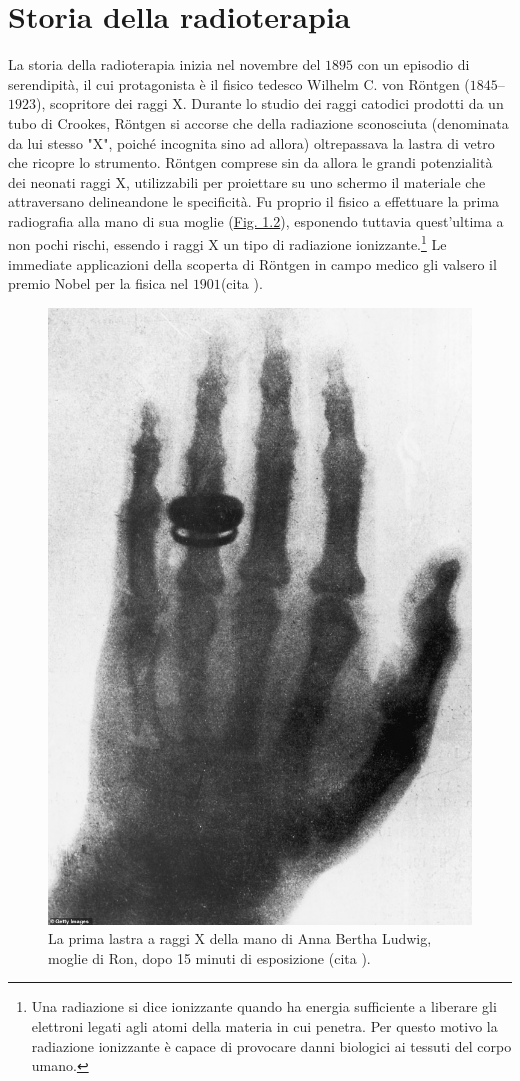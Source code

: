\documentclass[12pt,a4paper,twoside]{report}
\begin{document}
	\section{Storia della radioterapia}
	La storia della radioterapia inizia nel novembre del $1895$ con un episodio di serendipità, il cui protagonista è il fisico tedesco Wilhelm C. von Röntgen ($1845$--$1923$), scopritore dei raggi X. Durante lo studio dei raggi catodici prodotti da un tubo di Crookes, Röntgen si accorse che della radiazione sconosciuta (denominata da lui stesso "X", poiché incognita sino ad allora) oltrepassava la lastra di vetro che ricopre lo strumento. Röntgen comprese sin da allora le grandi potenzialità dei neonati raggi X, utilizzabili per proiettare su uno schermo il materiale che attraversano delineandone le specificità. Fu proprio il fisico a effettuare la prima radiografia alla mano di sua moglie (\hyperref[fig:rongten]{Fig. 1.2}), esponendo tuttavia quest'ultima a non pochi rischi, essendo i raggi X un tipo di radiazione ionizzante.\footnote{Una radiazione si dice ionizzante quando ha energia sufficiente a liberare gli elettroni legati agli atomi della materia in cui penetra. Per questo motivo la radiazione ionizzante è capace di provocare danni biologici ai tessuti del corpo umano.} Le immediate applicazioni della scoperta di Röntgen in campo medico gli valsero il premio Nobel per la fisica nel $1901$(cita
	).
	
	\begin{figure}[H]
		\centering
		\includegraphics[width=0.5\linewidth]{images/rongten.jpg}
		\caption{La prima lastra a raggi X della mano di Anna Bertha Ludwig, moglie di Ron, dopo 15 minuti di esposizione (cita
			).}
		\label{fig:rongten}
	\end{figure}
	
\end{document}
